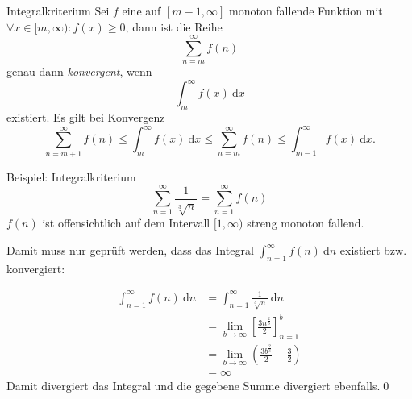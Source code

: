 \documentclass[german]{spicker}
\newcommand{\dx}{~\mathrm{d}x}
\newcommand{\dn}{~\mathrm{d}n}
\begin{document}
\begin{defi}{Integralkriterium}
    Sei $f$ eine auf $[m-1, \infty]$ monoton fallende Funktion mit $\forall x \in [m, \infty) : f(x) \geq 0$, dann ist die Reihe
    $$
        \sum^\infty_{n=m} f(n)
    $$
    genau dann \emph{konvergent}, wenn
    $$
        \int^\infty_m f(x) \dx
    $$
    existiert. Es gilt bei Konvergenz
    $$
        \sum^\infty_{n=m+1} f(n) \leq \int^\infty_m f(x) \dx \leq \sum^\infty_{n=m} f(n) \leq \int^\infty_{m-1} f(x) \dx.
    $$
\end{defi}

\begin{bonus}{Beispiel: Integralkriterium}
    \[
        \sum^\infty_{n=1} \frac{1}{\sqrt[3]{n}} = \sum^\infty_{n=1} f(n)
    \]
    $f(n)$ ist offensichtlich auf dem Intervall $[1, \infty )$ streng monoton fallend.

    Damit muss nur geprüft werden, dass das Integral $\int^\infty_{n=1} f(n) \dn$ existiert bzw. konvergiert:

    $$
        \begin{aligned}
            \int^\infty_{n=1} f(n) \dn
             & ={} \int^\infty_{n=1} \frac{1}{\sqrt[3]{n}} \dn                              \\
             & ={} \lim_{b\to\infty} \left[ \frac{3n^{\frac{2}{3}}}{2} \right]^b_{n=1}      \\
             & ={} \lim_{b\to\infty} \left( \frac{3b^{\frac{2}{3}}}{2} - \frac{3}{2}\right) \\
             & ={} \infty
        \end{aligned}
    $$
    Damit divergiert das Integral und die gegebene Summe divergiert ebenfalls.\qed
\end{bonus}
\end{document}
